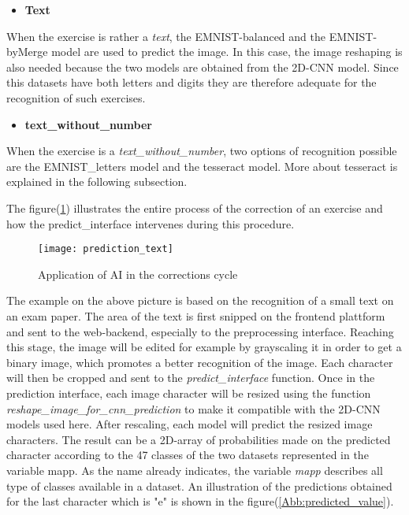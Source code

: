 \begin{itemize}
    \item \textbf{Text}
\end{itemize}
When the exercise is rather a \emph{text}, the EMNIST-balanced and the EMNIST-byMerge model are used to predict the image. 
In this case, the image reshaping is also 
needed because the two models are obtained from the 2D-CNN model. Since this datasets have both letters and digits they are therefore 
adequate for the recognition of such exercises. 

\begin{itemize}
    \item \textbf{text\_without\_number}
\end{itemize}
When the exercise is a \emph{text\_without\_number}, two options of recognition possible are the EMNIST\_letters model and the tesseract 
model. More about tesseract is explained in the following subsection.
\hfill \break

\noindent  
The figure(\ref{Abb:ki_application})  illustrates the entire process of the correction of an exercise 
and how the predict\_interface intervenes during this procedure.

\begin{figure}[htb]
	\centering
	\texttt{[image: prediction\_text]}
	\caption[Prediction interface]{Application of AI in the corrections cycle} \label{Abb:ki_application}
\end{figure}

\noindent
The example on the above picture is based on the recognition of a small text on an exam paper. 
The area of the text is first snipped on the frontend 
plattform and sent to the web-backend, especially to the preprocessing interface. 
Reaching this stage, the image will be edited for example by grayscaling it in order to get a binary image, 
which promotes a better recognition of the image. 
Each character will then be cropped and sent to the \emph{predict\_interface} function. 
Once in the prediction interface, each image character will be resized using the function 
\emph{reshape\_image\_for\_cnn\_prediction} to make it compatible with the 2D-CNN models used here. 
After rescaling, each model will predict the resized image characters. 
The result can be a 2D-array of probabilities made on the predicted character according to the 47 classes of the two datasets 
represented in the variable mapp. 
As the name already indicates, the variable \emph{mapp} describes all type of classes available in a dataset. 
An illustration of the predictions obtained for the last character which is "e" is shown in the figure(\ref{Abb:predicted_value}). 


